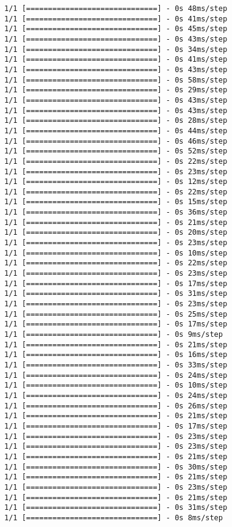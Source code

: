 \documentclass[11pt]{article}
\begin{document}
\begin{Verbatim}[commandchars=\\\{\}]
1/1 [==============================] - 0s 48ms/step
1/1 [==============================] - 0s 41ms/step
1/1 [==============================] - 0s 45ms/step
1/1 [==============================] - 0s 43ms/step
1/1 [==============================] - 0s 34ms/step
1/1 [==============================] - 0s 41ms/step
1/1 [==============================] - 0s 43ms/step
1/1 [==============================] - 0s 58ms/step
1/1 [==============================] - 0s 29ms/step
1/1 [==============================] - 0s 43ms/step
1/1 [==============================] - 0s 43ms/step
1/1 [==============================] - 0s 28ms/step
1/1 [==============================] - 0s 44ms/step
1/1 [==============================] - 0s 46ms/step
1/1 [==============================] - 0s 52ms/step
1/1 [==============================] - 0s 22ms/step
1/1 [==============================] - 0s 23ms/step
1/1 [==============================] - 0s 12ms/step
1/1 [==============================] - 0s 22ms/step
1/1 [==============================] - 0s 15ms/step
1/1 [==============================] - 0s 36ms/step
1/1 [==============================] - 0s 21ms/step
1/1 [==============================] - 0s 20ms/step
1/1 [==============================] - 0s 23ms/step
1/1 [==============================] - 0s 10ms/step
1/1 [==============================] - 0s 22ms/step
1/1 [==============================] - 0s 23ms/step
1/1 [==============================] - 0s 17ms/step
1/1 [==============================] - 0s 31ms/step
1/1 [==============================] - 0s 23ms/step
1/1 [==============================] - 0s 25ms/step
1/1 [==============================] - 0s 17ms/step
1/1 [==============================] - 0s 9ms/step
1/1 [==============================] - 0s 21ms/step
1/1 [==============================] - 0s 16ms/step
1/1 [==============================] - 0s 33ms/step
1/1 [==============================] - 0s 24ms/step
1/1 [==============================] - 0s 10ms/step
1/1 [==============================] - 0s 24ms/step
1/1 [==============================] - 0s 26ms/step
1/1 [==============================] - 0s 21ms/step
1/1 [==============================] - 0s 17ms/step
1/1 [==============================] - 0s 23ms/step
1/1 [==============================] - 0s 23ms/step
1/1 [==============================] - 0s 21ms/step
1/1 [==============================] - 0s 30ms/step
1/1 [==============================] - 0s 21ms/step
1/1 [==============================] - 0s 23ms/step
1/1 [==============================] - 0s 21ms/step
1/1 [==============================] - 0s 31ms/step
1/1 [==============================] - 0s 8ms/step

\end{Verbatim}
\end{document}
